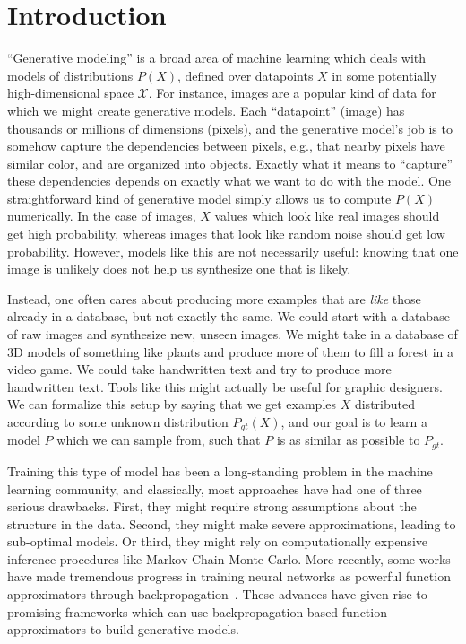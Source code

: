 \documentclass[a4paper, 11pt]{article} %
\begin{document}
\section{Introduction}
``Generative modeling'' is a broad area of machine learning which deals with models of distributions $P(X)$, defined over datapoints $X$ in some potentially high-dimensional space $\mathcal{X}$.  
For instance, images are a popular kind of data for which we might create generative models.
Each ``datapoint'' (image) has thousands or millions of dimensions (pixels), and the generative model's job is to somehow capture the dependencies between pixels, e.g., that nearby pixels have similar color, and are organized into objects.
Exactly what it means to ``capture'' these dependencies depends on exactly what we want to do with the model.
One straightforward kind of generative model simply allows us to compute $P(X)$ numerically.
In the case of images, $X$ values which look like real images should get high probability, whereas images that look like random noise should get low probability.
However, models like this are not necessarily useful: knowing that one image is unlikely does not help us synthesize one that is likely.

Instead, one often cares about producing more examples that are \textit{like} those already in a database, but not exactly the same.  
We could start with a database of raw images and synthesize new, unseen images.  
We might take in a database of 3D models of something like plants and produce more of them to fill a forest in a video game.
We could take handwritten text and try to produce more handwritten text.
Tools like this might actually be useful for graphic designers.
We can formalize this setup by saying that we get examples $X$ distributed according to some unknown distribution $P_{gt}(X)$, and our goal is to learn a model $P$ which we can sample from, such that $P$ is as similar as possible to $P_{gt}$.  

Training this type of model has been a long-standing problem in the machine learning community, and classically, most approaches have had one of three serious drawbacks.
First, they might require strong assumptions about the structure in the data.
Second, they might make severe approximations, leading to sub-optimal models.
Or third, they might rely on computationally expensive inference procedures like Markov Chain Monte Carlo.
More recently, some works have made tremendous progress in training neural networks as powerful function approximators through backpropagation~\cite{krizhevsky2012imagenet}.
These advances have given rise to promising frameworks which can use backpropagation-based function approximators to build generative models.
\end{document}
